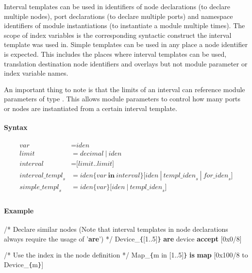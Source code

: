 \documentclass[a4paper,11pt,twoside]{report}
\begin{document}
{{{Interval templates can be used in identifiers of node declarations (to declare multiple nodes), port declarations (to declare multiple ports) and namespace identifiers of module instantiations (to instantiate a module multiple times).
The scope of index variables is the corresponding syntactic construct the interval template was used in.
Simple templates can be used in any place a node identifier is expected.
This includes the places where interval templates can be used, translation destination node identifiers and overlays but not module parameter or index variable names.

An important thing to note is that the limits of an interval can reference module parameters of type .
This allows module parameters to control how many ports or nodes are instantiated from a certain interval template.

\paragraph{Syntax}
\begin{align*}
    \textit{var} & \mathop{=}
        \textit{iden}\\
    \textit{limit} & \mathop{=}
        \textit{decimal}\ |\ \textit{iden} \\
    \textit{interval} & \mathop{=}
        \textbf{[}\textit{limit}\textbf{..}\textit{limit}\textbf{]}\\
    \textit{interval\_templ}_s & \mathop{=}
        \textit{iden}\textbf{\{}\textit{var}\ \textbf{in}\ \textit{interval}\textbf{\}}
        \Big[
            \textit{iden}\ |\ \textit{templ\_iden}_s\ |\ \textit{for\_iden}_s
        \Big]\\
    \textit{simple\_templ}_s & \mathop{=}
        \textit{iden}\textbf{\{}\textit{var}\textbf{\}}\Big[\textit{iden}\ |\ \textit{templ\_iden}_s\Big]\\
\end{align*}

\paragraph{Example}
\begin{syntax}
    /* Declare similar nodes
       (Note that interval templates in node declarations
       always require the usage of '\textbf{are}') */
    Device_\verb+{+[1..5]\verb+}+ \textbf{are} device \textbf{accept} [0x0/8]

    /* Use the index in the node definition */
    Map_\verb+{+m in [1..5]\verb+}+ \textbf{is} \textbf{map} [0x100/8 to Device_\verb+{+m\verb+}+]


\end{syntax}}}}
\end{document}
